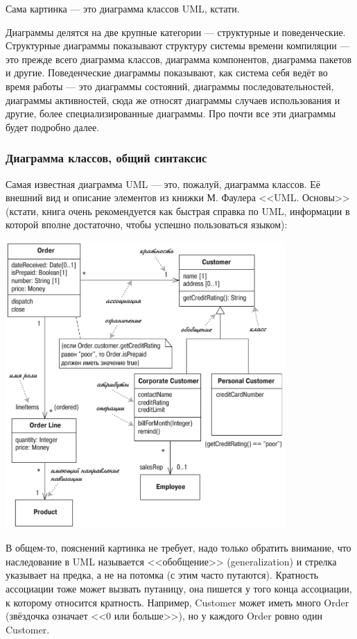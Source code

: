 \documentclass{../text-style}
\begin{document}
Сама картинка --- это диаграмма классов UML, кстати.

Диаграммы делятся на две крупные категории --- структурные и поведенческие. Структурные диаграммы показывают структуру системы времени компиляции --- это прежде всего диаграмма классов, диаграмма компонентов, диаграмма пакетов и другие. Поведенческие диаграммы показывают, как система себя ведёт во время работы --- это диаграммы состояний, диаграммы последовательностей, диаграммы активностей, сюда же относят диаграммы случаев использования и другие, более специализированные диаграммы. Про почти все эти диаграммы будет подробно далее.

\subsubsection{Диаграмма классов, общий синтаксис}

Самая известная диаграмма UML --- это, пожалуй, диаграмма классов. Её внешний вид и описание элементов из книжки М. Фаулера <<UML. Основы>> (кстати, книга очень рекомендуется как быстрая справка по UML, информации в которой вполне достаточно, чтобы успешно пользоваться языком):

\begin{center}
    \includegraphics[width=0.8\textwidth]{umlClassDiagram.png}
\end{center}

В общем-то, пояснений картинка не требует, надо только обратить внимание, что наследование в UML называется <<обобщение>> (generalization) и стрелка указывает на предка, а не на потомка (с этим часто путаются). Кратность ассоциации тоже может вызвать путаницу, она пишется у того конца ассоциации, к которому относится кратность. Например, Customer может иметь много Order (звёздочка означает <<0 или больше>>), но у каждого Order ровно один Customer. 
\end{document}
